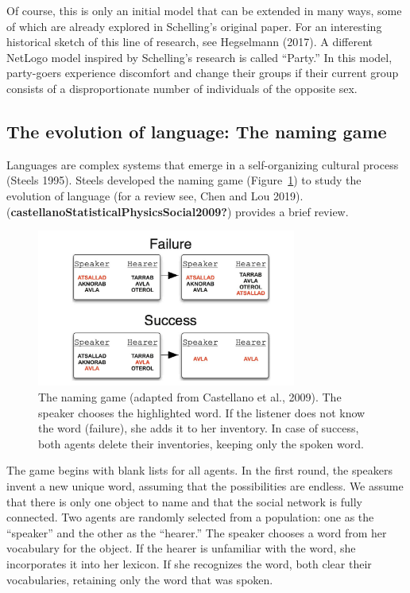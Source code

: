\documentclass[
  letterpaper,
]{scrbook}
\begin{document}
Of course, this is only an initial model that can be extended in many
ways, some of which are already explored in Schelling's original paper.
For an interesting historical sketch of this line of research, see
Hegselmann (2017). A different NetLogo model inspired by Schelling's
research is called ``Party.'' In this model, party-goers experience
discomfort and change their groups if their current group consists of a
disproportionate number of individuals of the opposite sex.

\hypertarget{the-evolution-of-language-the-naming-game}{%
\subsection{The evolution of language: The naming
game}\label{the-evolution-of-language-the-naming-game}}

Languages are complex systems that emerge in a self-organizing cultural
process (Steels 1995). Steels developed the naming game
(Figure~\ref{fig-ch7-img2-old-90}) to study the evolution of language
(for a review see, Chen and Lou 2019).
(\textbf{castellanoStatisticalPhysicsSocial2009?}) provides a brief
review.

\begin{figure}

{\centering \includegraphics[width=3.35526in,height=\textheight]{media/ch7/image2.jpg}

}

\caption{\label{fig-ch7-img2-old-90}The naming game (adapted from
Castellano et al., 2009). The speaker chooses the highlighted word. If
the listener does not know the word (failure), she adds it to her
inventory. In case of success, both agents delete their inventories,
keeping only the spoken word.}

\end{figure}

The game begins with blank lists for all agents. In the first round, the
speakers invent a new unique word, assuming that the possibilities are
endless. We assume that there is only one object to name and that the
social network is fully connected. Two agents are randomly selected from
a population: one as the ``speaker'' and the other as the ``hearer.''
The speaker chooses a word from her vocabulary for the object. If the
hearer is unfamiliar with the word, she incorporates it into her
lexicon. If she recognizes the word, both clear their vocabularies,
retaining only the word that was spoken.
\end{document}
